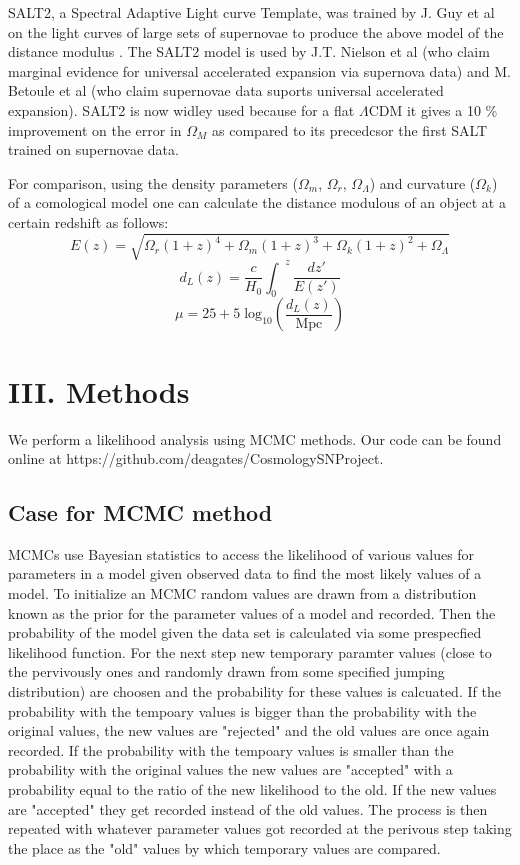 \documentclass[aps,prl,reprint]{revtex4-1}
\begin{document}
SALT2, a Spectral Adaptive Light curve Template, was trained by J. Guy et al on the light curves of large sets of supernovae to produce the above model of the distance modulus \cite{salt2}. The SALT2 model is used by J.T. Nielson et al (who claim marginal evidence for universal accelerated expansion via supernova data) and M. Betoule et al (who claim supernovae data suports universal accelerated expansion). SALT2 is now widley used because for a flat $\Lambda$CDM it gives a 10 \% improvement on the error in $\Omega_M$ as compared to its precedcsor the first SALT trained on supernovae data.

For comparison, using the density parameters ($\Omega_m$, $\Omega_{r}$, $\Omega_{\Lambda}$) and curvature ($\Omega_k$) of a comological model one can calculate the distance modulous of an object at a certain redshift as follows:  
$$E(z)=\sqrt{\Omega_{r}(1+z)^4 + \Omega_m(1+z)^3 + \Omega_k(1+z)^2 + \Omega_{\Lambda}} $$
$$d_L(z)=\frac{c}{H_0} {\int_0}^z \frac{dz'}{E(z')} $$
\begin{equation}
\mu = 25 + 5\;\text{log}_{10} \left( \frac{d_L(z)}{\text{Mpc}} \right) 
\end{equation}


\section{III. Methods}
We perform a likelihood analysis using MCMC methods. Our code can be found online at https://github.com/deagates/CosmologySNProject.
\subsection{Case for MCMC method}
MCMCs use Bayesian statistics to access the likelihood of various values for parameters in a model given observed data to find the most likely values of a model.
To initialize an MCMC random values are drawn from a distribution known as the prior for the parameter values of a model and recorded. Then the probability of the model given the data set is calculated via some prespecfied likelihood function. For the next step new temporary paramter values (close to the pervivously  ones and randomly drawn from some specified jumping distribution) are choosen and the probability for these values is calcuated. If the probability with the tempoary values is bigger than the probability with the original values, the new values are "rejected" and the old values are once again recorded. If the probability with the tempoary values is smaller than the probability with the original values the new values are "accepted" with a probability equal to the ratio of the new likelihood to the old. If the new values are "accepted" they get recorded instead of the old values. The process is then repeated with whatever parameter values got recorded at the perivous step taking the place as the "old" values by which temporary values are compared.
\end{document}
